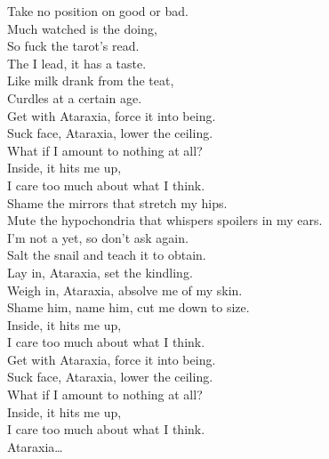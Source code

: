



Take no position on good or bad. \\
Much watched is the doing, \\
So fuck the tarot's read. \\
The  I lead, it has a taste. \\
Like milk drank from the teat, \\
Curdles at a certain age. \\

Get with Ataraxia, force it into being. \\
Suck face, Ataraxia, lower the ceiling. \\
What if I amount to nothing at all? \\
Inside, it hits me up, \\
I care too much about what I think. \\

Shame the mirrors that stretch my hips. \\
Mute the hypochondria that whispers spoilers in my ears. \\
I'm not a  yet, so don't ask again. \\
Salt the snail and teach it to obtain. \\

Lay in, Ataraxia, set the kindling. \\
Weigh in, Ataraxia, absolve me of my skin. \\
Shame him, name him, cut me down to size. \\
Inside, it hits me up, \\
I care too much about what I think. \\

Get with Ataraxia, force it into being. \\
Suck face, Ataraxia, lower the ceiling. \\
What if I amount to nothing at all? \\
Inside, it hits me up, \\
I care too much about what I think. \\

Ataraxia… \\


